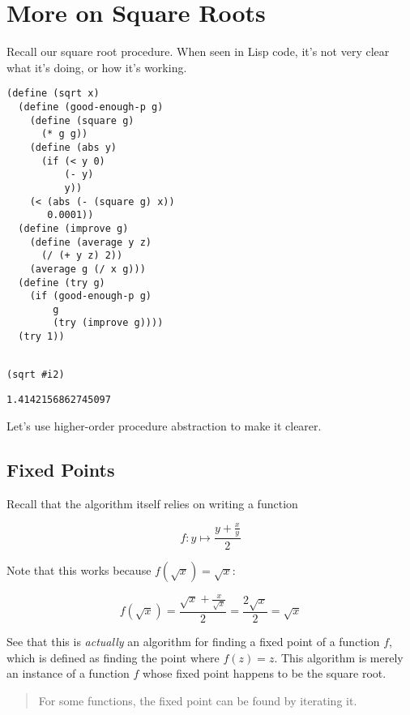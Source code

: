 \documentclass[9pt]{report}
\begin{document}
\section{More on Square Roots}
\label{sec:org63ee08c}

Recall our square root procedure. When seen in Lisp code, it's not
very clear what it's doing, or how it's working.

\begin{verbatim}
(define (sqrt x)
  (define (good-enough-p g)
    (define (square g)
      (* g g))
    (define (abs y)
      (if (< y 0)
          (- y)
          y))
    (< (abs (- (square g) x))
       0.0001))
  (define (improve g)
    (define (average y z)
      (/ (+ y z) 2))
    (average g (/ x g)))
  (define (try g)
    (if (good-enough-p g)
        g
        (try (improve g))))
  (try 1))
\end{verbatim}

\begin{verbatim}

(sqrt #i2)
\end{verbatim}

\begin{verbatim}
1.4142156862745097
\end{verbatim}


Let's use higher-order procedure abstraction to make it clearer.

\subsection{Fixed Points}
\label{sec:org312c0da}

Recall that the algorithm itself relies on writing a function

$$f\colon y\mapsto \frac{y+\frac{x}{y}}{2}$$

Note that this works because \(f(\sqrt{x}) = \sqrt{x}\):

$$f(\sqrt{x})=\frac{\sqrt{x}+\frac{x}{\sqrt{x}}}{2} = \frac{2\sqrt{x}}{2} = \sqrt{x}$$

See that this is \emph{actually} an algorithm for finding a fixed point
of a function \(f\), which is defined as finding the point where
\(f(z)=z\). This algorithm is merely an instance of a function \(f\)
whose fixed point happens to be the square root.

\begin{quote}
For some functions, the fixed point can be found by iterating it.
\end{quote}
\end{document}

